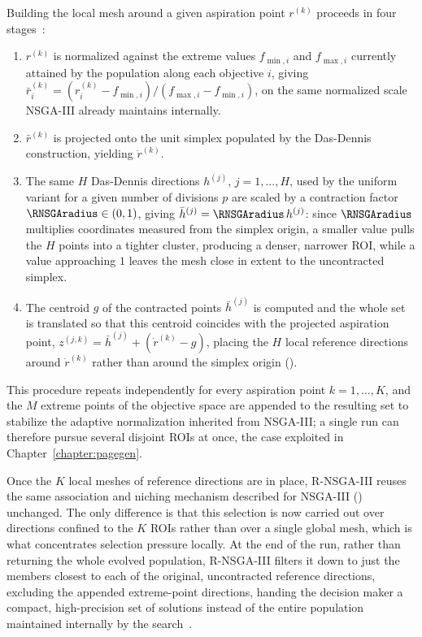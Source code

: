 Building the local mesh around a given aspiration point $r^{(k)}$ proceeds in four stages~\cite{rnsga-iii}:
\begin{enumerate}
    \item $r^{(k)}$ is normalized against the extreme values $f_{\min,i}$ and $f_{\max,i}$ currently attained by the population along each objective $i$, giving $\bar{r}_i^{(k)} = (r_i^{(k)} - f_{\min,i})/(f_{\max,i} - f_{\min,i})$, on the same normalized scale NSGA-III already maintains internally.
    \item $\bar{r}^{(k)}$ is projected onto the unit simplex populated by the Das-Dennis construction, yielding $\dot{r}^{(k)}$.
    \item The same $H$ Das-Dennis directions $h^{(j)}$, $j = 1, \dots, H$, used by the uniform variant for a given number of divisions $p$ are scaled by a contraction factor $\RNSGAradius \in (0,1)$, giving $\bar{h}^{(j)} = \RNSGAradius\, h^{(j)}$: since $\RNSGAradius$ multiplies coordinates measured from the simplex origin, a smaller value pulls the $H$ points into a tighter cluster, producing a denser, narrower ROI, while a value approaching $1$ leaves the mesh close in extent to the uncontracted simplex.
    \item The centroid $g$ of the contracted points $\bar{h}^{(j)}$ is computed and the whole set is translated so that this centroid coincides with the projected aspiration point, $z^{(j,k)} = \bar{h}^{(j)} + (\dot{r}^{(k)} - g)$, placing the $H$ local reference directions around $\dot{r}^{(k)}$ rather than around the simplex origin ().
\end{enumerate}
This procedure repeats independently for every aspiration point $k=1,\dots,K$, and the $M$ extreme points of the objective space are appended to the resulting set to stabilize the adaptive normalization inherited from NSGA-III; a single run can therefore pursue several disjoint ROIs at once, the case exploited in Chapter~\ref{chapter:pagegen}.

Once the $K$ local meshes of reference directions are in place, R-NSGA-III reuses the same association and niching mechanism described for NSGA-III () unchanged. The only difference is that this selection is now carried out over directions confined to the $K$ ROIs rather than over a single global mesh, which is what concentrates selection pressure locally. At the end of the run, rather than returning the whole evolved population, R-NSGA-III filters it down to just the members closest to each of the original, uncontracted reference directions, excluding the appended extreme-point directions, handing the decision maker a compact, high-precision set of solutions instead of the entire population maintained internally by the search~\cite{rnsga-iii}.

